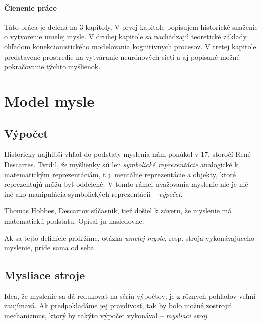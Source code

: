 \subsubsection{Členenie práce}

Táto práca je delená na 3 kapitoly. V prvej kapitole popisujem historické snaženie o vytvorenie umelej mysle. V druhej kapitole sa nachádzajú teoretické základy ohľadom konekcionistického modelovania kognitívnych procesov. V tretej kapitole predstavené prostredie na vytváranie neurónových sietí a aj popisané možné pokračovanie týchto myšlienok.


\chapter{Model mysle}

\section{Výpočet}

Historicky najhlbší vhľad do podstaty myslenia nám ponúkol v 17. storočí René Descartes. Tvrdil, že myšlienky sú len \emph{symbolické reprezentácie} analogické k matematickým reprezentáciám, t.j. mentálne reprezentácie a objekty, ktoré reprezentujú môžu byť oddelené. V tomto rámci uvažovania myslenie nie je nič iné ako manipulácia symbolických reprezentácií -- \emph{výpočet}. \autocite[str. 31]{Petru2007}

Thomas Hobbes, Descartov súčasník, tiež došiel k záveru, že myslenie má matematickú podstatu. Opísal ju nasledovne:
\begin{quote}\autocite[kap. 5, O rozumu a věde]{Hobbes2009} \end{quote}

Ak sa tejto definície pridržíme, otázka \emph{umelej mysle}, resp. stroja vykonávajúceho myslenie, príde sama od seba.

\section{Mysliace stroje}

Idea, že myslenie sa dá redukovať na sériu výpočtov, je z rôznych pohľadov veľmi zaujímavá. Ak predpokladáme jej pravdivosť, tak by bolo možné zostrojiť mechanizmus, ktorý by takýto výpočet vykonával -- \emph{mysliaci stroj}.

